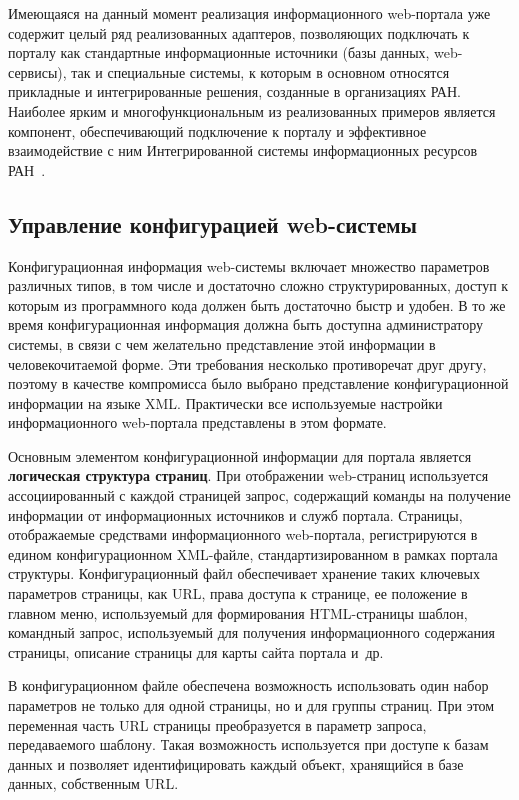 \begin{multicols}{2}
{}

 Имеющаяся на данный момент реализация информационного web-портала уже
содержит целый ряд реализованных адаптеров, позволяющих подключать к порталу как
стандартные информационные источники (базы данных, web-сервисы), так и специальные
системы, к которым в основном относятся прикладные и интегрированные решения,
созданные в организациях РАН. Наиболее ярким и многофункциональным из
реализованных примеров является компонент, обеспечивающий подключение к порталу и
эффективное взаимодействие с ним Интегрированной системы информационных ресурсов
РАН~\cite{8bos}.

\subsection{Управление конфигурацией web-системы} %

 Конфигурационная информация web-системы включает множество параметров
различных типов, в том числе и достаточно сложно структурированных, доступ к которым
из программного кода должен быть достаточно быстр и удобен. В то же время
конфигурационная информация должна быть доступна администратору системы, в связи с
чем желательно представление этой информации в человекочитаемой форме. Эти
требования несколько противоречат друг другу, поэтому в качестве компро\-мис\-са было
выбрано представление конфигурационной информации на языке XML. Практически все
используемые настройки информационного web-портала представлены в этом формате.

 Основным элементом конфигурационной информации для портала является
\textbf{логическая структура страниц}. При отображении web-стра\-ниц
используется ассоциированный с каждой страницей запрос, содержащий команды на
получение информации от информационных источников и служб портала. Страницы,
отображаемые средствами информационного web-портала, регистрируются в едином
конфигурационном XML-фай\-ле, стандартизированном в рамках портала структуры.
Конфигурационный файл обеспечивает хранение таких ключевых параметров
страницы, как URL, права доступа к странице, ее положение в главном меню,
используемый для формирования HTML-стра\-ни\-цы шаблон, командный запрос,
используемый для получения информационного содержания страницы, описание
страницы для карты сайта портала %
 и~др.


 В конфигурационном файле обеспечена возможность использовать один набор
параметров не только для одной страницы, но и для группы страниц. При этом
переменная часть URL страницы преобразуется в параметр запроса, передаваемого
шаблону. Такая возможность используется при доступе к базам данных и позволяет
идентифицировать каждый объект, хранящийся в базе данных, собственным URL.


\end{multicols}
